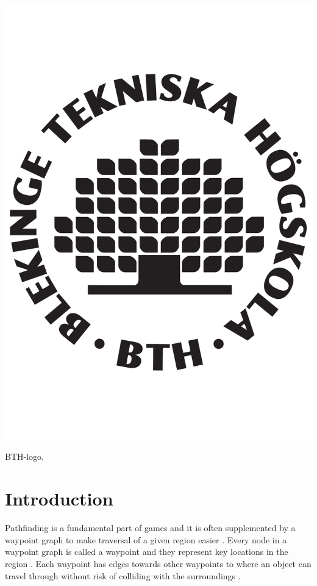 \documentclass[sigconf]{acmart}
\begin{document}
\begin{teaserfigure}
  \centering
  \includegraphics[scale=0.5]{bthnotext}
  \caption{BTH-logo.}
  \label{fig:teaser}
\end{teaserfigure}

\maketitle

\section{Introduction}
Pathfinding is a fundamental part of games \cite{dynaPF15}\cite{roboGame15} and it is often supplemented by a waypoint graph to make traversal of a given region easier \cite{dynaPF15}. Every node in a waypoint graph is called a waypoint and they represent key locations in the region \cite{dynaPF15}. Each waypoint has edges towards other waypoints to where an object can travel through without risk of colliding with the surroundings \cite{dynaPF15}.
	
\end{document}
